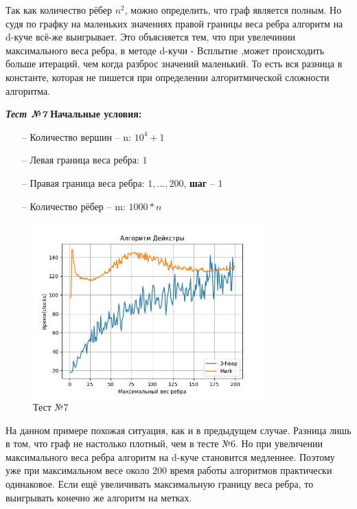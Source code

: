 \begin{text}
Так как количество рёбер $n^2$, можно определить, что граф является полным. Но судя по графку на маленьких значениях правой границы веса ребра алгоритм на d-куче всё-же выигрывает. Это объясняется тем, что при увелечинии максимального веса ребра, в методе d-кучи - \guillemotleft Всплытие \guillemotright ,может происходить больше итераций, чем когда разброс значений маленький. То есть вся разница в константе, которая не пишется при определении алгоритмической сложности алгоритма.\\
\newpage

\begin{center}
\textbf{\textit{Тест №7}}
\textbf{Начальные условия:}

\begin{enumerate}
	\item[--] Количество вершин -- n: $10^4 + 1$
	\item[--] Левая граница веса ребра: $1$
	\item[--] Правая граница веса ребра: $1,...,200$, \textbf{шаг} -- $1$
	\item[--] Количество рёбер -- m: $1000 * n$
\end{enumerate}

\end{center}
\begin{figure}[h]
  \centering
  \includegraphics[width=0.8\textwidth]{pictures/7.jpeg}
  \caption{Тест №7}
  \label{fig:pict_7}
\end{figure}

На данном примере похожая ситуация, как и в предыдущем случае. Разница лишь в том, что граф не настолько плотный, чем в тесте №6. Но при увеличении максимального веса ребра алгоритм на d-куче становится медленнее. Поэтому уже при максимальном весе около $200$ время работы алгоритмов практически одинаковое. Если ещё увеличивать максимальную границу веса ребра, то выигрывать конечно же алгоритм на метках.\\


\end{text}
